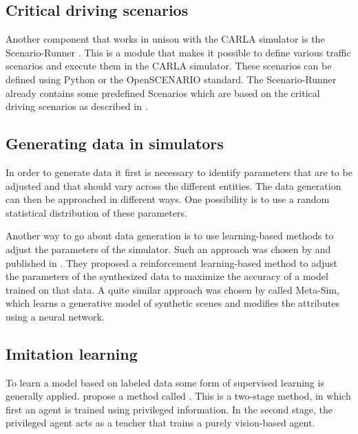\documentclass[conference, a4paper, 11pt]{IEEEtran}
\begin{document}
\subsection{Critical driving scenarios}

Another component that works in unison with the CARLA simulator is the Scenario-Runner \cite{CARLA:Scenario-Runner}.
This is a module that makes it possible to define various traffic scenarios and execute them in the CARLA simulator.
These scenarios can be defined using Python or the OpenSCENARIO \cite{OpenScenario} standard.
The Scenario-Runner already contains some predefined Scenarios which are based on the critical driving scenarios as described in  \cite{NHTSA:PreCrashScenarios}.

\subsection{Generating data in simulators}

In order to generate data it first is necessary to identify parameters that are to be adjusted and that should vary across the different entities.
The data generation can then be approached in different ways.
One possibility is to use a random statistical distribution of these parameters. 

Another way to go about data generation is to use learning-based methods to adjust the parameters of the simulator.
Such an approach was chosen by \citeauthor{DBLP:LearningToSimulate} and published in  \cite{DBLP:LearningToSimulate}.
They proposed a reinforcement learning-based method to adjust the parameters of the synthesized data to maximize the accuracy of a model trained on that data.
A quite similar approach was chosen by \citeauthor{DBLP:Meta-Sim} \cite{DBLP:Meta-Sim} called Meta-Sim, which learns a generative model of synthetic scenes and modifies the attributes using a neural network.

\subsection{Imitation learning}

To learn a model based on labeled data some form of supervised learning is generally applied.
\citeauthor{Chen:LearningByCheating} propose a method called  \cite{Chen:LearningByCheating}.
This is a two-stage method, in which first an agent is trained using privileged information.
In the second stage, the privileged agent acts as a teacher that trains a purely vision-based agent.
\end{document}
